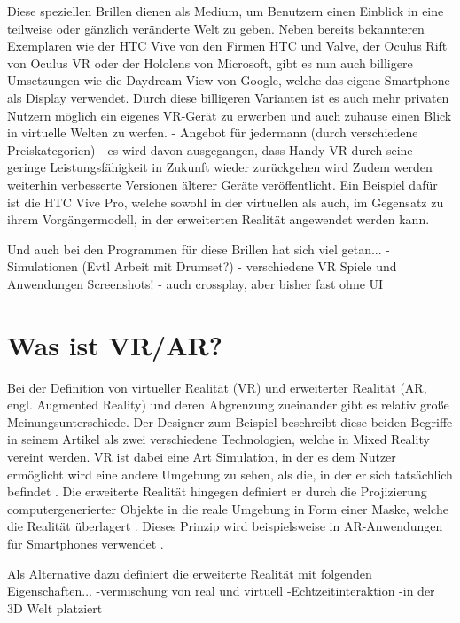 	Diese speziellen Brillen dienen als Medium, um Benutzern einen Einblick in eine teilweise oder gänzlich veränderte Welt zu geben.
	Neben bereits bekannteren Exemplaren wie der HTC Vive von den Firmen HTC und Valve, der Oculus Rift von Oculus VR oder der Hololens von Microsoft, gibt es nun auch billigere Umsetzungen wie die Daydream View von Google, welche das eigene Smartphone als Display verwendet. 
	Durch diese billigeren Varianten ist es auch mehr privaten Nutzern möglich ein eigenes VR-Gerät zu erwerben und auch zuhause einen Blick in virtuelle Welten zu werfen.
	- Angebot für jedermann (durch verschiedene Preiskategorien)
	- es wird davon ausgegangen, dass Handy-VR durch seine geringe Leistungsfähigkeit in Zukunft wieder zurückgehen wird
	Zudem werden weiterhin verbesserte Versionen älterer Geräte veröffentlicht. Ein Beispiel dafür ist die HTC Vive Pro, welche sowohl in der virtuellen als auch, im Gegensatz zu ihrem Vorgängermodell, in der erweiterten Realität angewendet werden kann.

	Und auch bei den Programmen für diese Brillen hat sich viel getan...
	- Simulationen (Evtl Arbeit mit Drumset?)
	- verschiedene VR Spiele und Anwendungen Screenshots!
	- auch crossplay, aber bisher fast ohne UI
	
	\section{Was ist VR/AR?}
	Bei der Definition von virtueller Realität (VR) und erweiterter Realität (AR, engl. Augmented Reality) und deren Abgrenzung zueinander gibt es relativ große Meinungsunterschiede. Der Designer  zum Beispiel beschreibt diese beiden Begriffe in seinem Artikel   als zwei verschiedene Technologien, welche in Mixed Reality vereint werden. VR ist dabei eine Art Simulation, in der es dem Nutzer ermöglicht wird eine andere Umgebung zu sehen, als die, in der er sich tatsächlich befindet . Die erweiterte Realität hingegen definiert er durch die Projizierung computergenerierter Objekte in die reale Umgebung in Form einer Maske, welche die Realität überlagert . Dieses Prinzip wird beispielsweise in AR-Anwendungen für Smartphones verwendet .
	
	Als Alternative dazu definiert  die erweiterte Realität mit folgenden Eigenschaften... 
	-vermischung von real und virtuell
	-Echtzeitinteraktion
	-in der 3D Welt platziert
	
